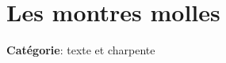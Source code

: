 \documentclass[a4paper,11pt,bibliography=totoc,numbers=noenddot,listof=flat,DIV=11,BCOR=0mm]{scrreprt}%
\begin{document}
%
%
%
%
%
%
%

\chapter[Texte et charpente: Les montres molles]{Les montres molles}

{\large \textbf{Catégorie}}:
 texte et charpente

\end{document}
